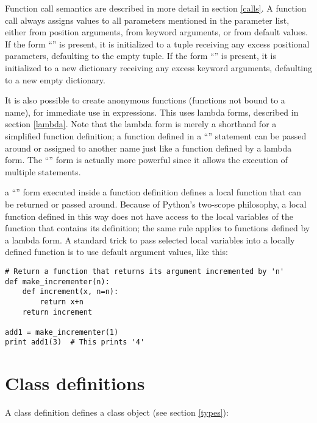 Function call semantics are described in more detail in section
\ref{calls}. 
A function call always assigns values to all parameters mentioned in
the parameter list, either from position arguments, from keyword
arguments, or from default values.  If the form ``''
is present, it is initialized to a tuple receiving any excess
positional parameters, defaulting to the empty tuple.  If the form
``'' is present, it is initialized to a new
dictionary receiving any excess keyword arguments, defaulting to a
new empty dictionary.





It is also possible to create anonymous functions (functions not bound
to a name), for immediate use in expressions.  This uses lambda forms,
described in section \ref{lambda}.  Note that the lambda form is
merely a shorthand for a simplified function definition; a function
defined in a ``'' statement can be passed around or
assigned to another name just like a function defined by a lambda
form.  The ``'' form is actually more powerful since it
allows the execution of multiple statements.

 a ``'' form executed inside a
function definition defines a local function that can be returned or
passed around.  Because of Python's two-scope philosophy, a local
function defined in this way does not have access to the local
variables of the function that contains its definition; the same rule
applies to functions defined by a lambda form.  A standard trick to
pass selected local variables into a locally defined function is to
use default argument values, like this:

\begin{verbatim}
# Return a function that returns its argument incremented by 'n'
def make_incrementer(n):
    def increment(x, n=n):
        return x+n
    return increment

add1 = make_incrementer(1)
print add1(3)  # This prints '4'
\end{verbatim}

\section{Class definitions} \label{class}

A class definition defines a class object (see section \ref{types}):

